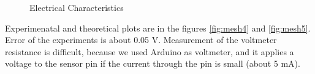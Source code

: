 \documentclass{article}
\begin{document}
\begin{figure}[htb!]
\begin{center}
\begin{minipage}[h]{0.47\linewidth}
\end{minipage}
\hfill
\begin{minipage}[h]{0.47\linewidth}
\end{minipage}

\end{center}
\caption{Electrical Characteristics}
\label{fig:mesh6}
\end{figure}


Experimenatal and theoretical plots are in the figures \ref{fig:mesh4} and \ref{fig:mesh5}. Error of the experiments is about 0.05 V. Measurement of the voltmeter resistance is difficult, because we used Arduino as voltmeter, and it applies a voltage to the sensor pin if the current through the pin is small (about 5 mA). \par
\end{document}

